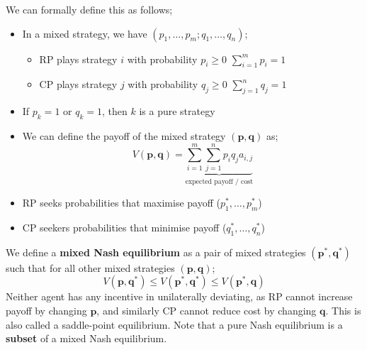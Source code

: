 \documentclass[a4paper, 12pt]{article}
\newcommand{\summation}[2]{\sum\limits_{#1}^{#2}}
\renewcommand{\vec}[1]{\boldsymbol{#1}}
\begin{document}
                We can formally define this as follows;
                \begin{itemize}
                    \itemsep0em
                    \item In a mixed strategy, we have $(p_1, \dots, p_m; q_1, \dots, q_n)$;
                        \begin{itemize}
                            \itemsep0em
                            \item RP plays strategy $i$ with probability $p_i \geq 0$ \hfill $\summation{i = 1}{m} p_i = 1$
                            \item CP plays strategy $j$ with probability $q_j \geq 0$ \hfill $\summation{j = 1}{n} q_j = 1$
                        \end{itemize}
                    \item If $p_k = 1$ or $q_k = 1$, then $k$ is a pure strategy
                    \item We can define the payoff of the mixed strategy $(\vec{p}, \vec{q})$ as;
                        $$V(\vec{p}, \vec{q}) = \underbrace{\summation{i = 1}{m} \summation{j = 1}{n} p_i q_j a_{i, j}}_\text{expected payoff / cost}$$
                    \item RP seeks probabilities that maximise payoff ($p^*_1, \dots, p^*_m$)
                    \item CP seekers probabilities that minimise payoff ($q^*_1, \dots, q^*_n$)
                \end{itemize}
                We define a \textbf{mixed Nash equilibrium} as a pair of mixed strategies $(\vec{p^*}, \vec{q^*})$ such that for all other mixed strategies $(\vec{p}, \vec{q})$;
                $$V(\vec{p}, \vec{q^*}) \leq V(\vec{p^*}, \vec{q^*}) \leq V(\vec{p^*}, \vec{q})$$
                Neither agent has any incentive in unilaterally deviating, as RP cannot increase payoff by changing $\vec{p}$, and similarly CP cannot reduce cost by changing $\vec{q}$.
                This is also called a saddle-point equilibrium.
                Note that a pure Nash equilibrium is a \textbf{subset} of a mixed Nash equilibrium.
\end{document}
